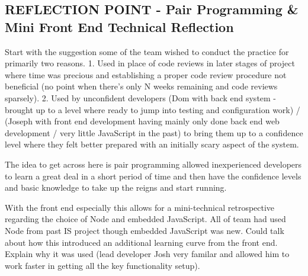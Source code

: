 \documentclass{l3proj}
\begin{document}
\subsection{REFLECTION POINT - Pair Programming \& Mini Front End Technical Reflection}
\label{sec:pairprogramming}


Start with the suggestion some of the team wished to conduct the practice for primarily two reasons. 1. Used in place of code reviews in later stages of project where time was precious and establishing a proper code review procedure not beneficial (no point when there's only N weeks remaining and code reviews sparsely). 2. Used by unconfident developers (Dom with back end system - brought up to a level where ready to jump into testing and configuration work) / (Joseph with front end development having mainly only done back end web development / very little JavaScript in the past) to bring them up to a confidence level where they felt better prepared with an initially scary aspect of the system.

The idea to get across here is pair programming allowed inexperienced developers to learn a great deal in a short period of time and then have the confidence levels and basic knowledge to take up the reigns and start running.

With the front end especially this allows for a mini-technical retrospective regarding the choice of Node and embedded JavaScript. All of team had used Node from past IS project though embedded JavaScript was new. Could talk about how this introduced an additional learning curve from the front end. Explain why it was used (lead developer Josh very familar and allowed him to work faster in getting all the key functionality setup).
\end{document}

